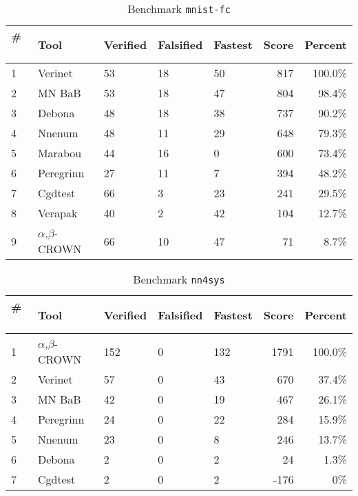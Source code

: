 
\begin{table}[h]
\begin{center}
\caption{Benchmark \texttt{mnist-fc}} \label{tab:cat_{cat}}
{\setlength{\tabcolsep}{2pt}
\begin{tabular}[h]{@{}lllllrr@{}}
\toprule
\textbf{\# ~} & \textbf{Tool} & \textbf{Verified} & \textbf{Falsified} & \textbf{Fastest} & \textbf{Score} & \textbf{Percent}\\
\midrule
1 & Verinet & 53 & 18 & 50 & 817 & 100.0\% \\
2 & MN BaB & 53 & 18 & 47 & 804 & 98.4\% \\
3 & Debona & 48 & 18 & 38 & 737 & 90.2\% \\
4 & Nnenum & 48 & 11 & 29 & 648 & 79.3\% \\
5 & Marabou & 44 & 16 & 0 & 600 & 73.4\% \\
6 & Peregrinn & 27 & 11 & 7 & 394 & 48.2\% \\
7 & Cgdtest & 66 & 3 & 23 & 241 & 29.5\% \\
8 & Verapak & 40 & 2 & 42 & 104 & 12.7\% \\
9 & $\alpha$,$\beta$-CROWN & 66 & 10 & 47 & 71 & 8.7\% \\
\bottomrule
\end{tabular}
}
\end{center}
\end{table}




\begin{table}[h]
\begin{center}
\caption{Benchmark \texttt{nn4sys}} \label{tab:cat_{cat}}
{\setlength{\tabcolsep}{2pt}
\begin{tabular}[h]{@{}lllllrr@{}}
\toprule
\textbf{\# ~} & \textbf{Tool} & \textbf{Verified} & \textbf{Falsified} & \textbf{Fastest} & \textbf{Score} & \textbf{Percent}\\
\midrule
1 & $\alpha$,$\beta$-CROWN & 152 & 0 & 132 & 1791 & 100.0\% \\
2 & Verinet & 57 & 0 & 43 & 670 & 37.4\% \\
3 & MN BaB & 42 & 0 & 19 & 467 & 26.1\% \\
4 & Peregrinn & 24 & 0 & 22 & 284 & 15.9\% \\
5 & Nnenum & 23 & 0 & 8 & 246 & 13.7\% \\
6 & Debona & 2 & 0 & 2 & 24 & 1.3\% \\
7 & Cgdtest & 2 & 0 & 2 & -176 & 0\% \\
\bottomrule
\end{tabular}
}
\end{center}
\end{table}




